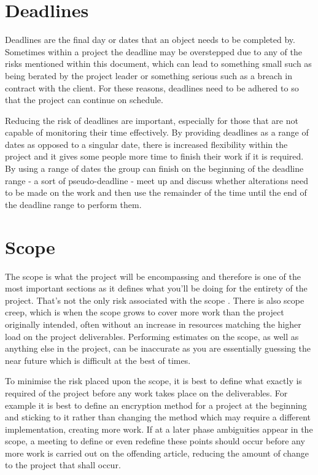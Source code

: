 \section{Deadlines}
Deadlines are the final day or dates that an object needs to be completed by.
Sometimes within a project the deadline may be overstepped due to any of the
risks mentioned within this document, which can lead to something small such as
being berated by the project leader or something serious such as a breach in
contract with the client.  For these reasons, deadlines need to be adhered to
so that the project can continue on schedule.

Reducing the risk of deadlines are important, especially for those that are not
capable of monitoring their time effectively.  By providing deadlines as a range
of dates as opposed to a singular date, there is increased flexibility within
the project and it gives some people more time to finish their work if it is
required.  By using a range of dates the group can finish on the beginning of
the deadline range - a sort of pseudo-deadline - meet up and discuss whether
alterations need to be made on the work and then use the remainder of the time
until the end of the deadline range to perform them.

\section{Scope}
The scope is what the project will be encompassing and therefore is one of the
most important sections as it defines what you'll be doing for the entirety of
the project.  That's not the only risk associated with the scope 
\cite{RiskList}.
There is also scope creep, which is when the scope grows to cover more work than
the project originally intended, often without an increase in resources matching
the higher load on the project deliverables.  Performing estimates on the scope,
as well as anything else in the project, can be inaccurate as you are
essentially guessing the near future which is difficult at the best of times.

To minimise the risk placed upon the scope, it is best to define what exactly is
required of the project before any work takes place on the deliverables.  For
example it is best to define an encryption method for a project at the beginning
and sticking to it rather than changing the method which may require a different
implementation, creating more work.  If at a later phase ambiguities appear in
the scope, a meeting to define or even redefine these points should occur before
any more work is carried out on the offending article, reducing the amount of
change to the project that shall occur.

